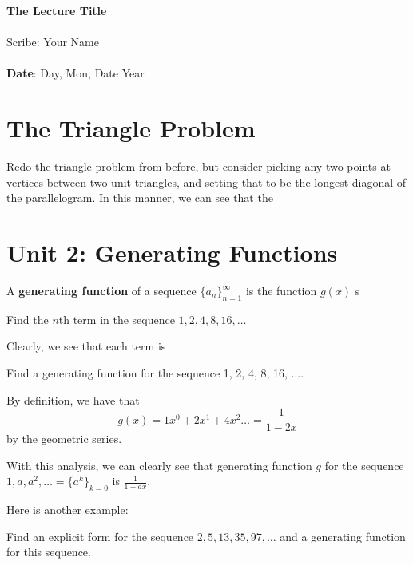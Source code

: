 \documentclass[11pt,twosided]{article}
\def\titlestring{The Lecture Title}
\def\scribestring{Your Name}
\def\datestring{Day, Mon, Date Year}
\begin{document}
\thispagestyle{plain}  %

\noindent
{\LARGE \textbf{\titlestring}}\\\\
%
{\Large Scribe: \scribestring}\\ \\
{\textbf{Date}: \datestring}


\noindent

\section{The Triangle Problem}
Redo the triangle problem from before, but consider picking any two points at vertices between two unit triangles, and setting that to be the longest diagonal of the parallelogram. In this manner, we can see that the 

\section{Unit 2: Generating Functions}
A \textbf{generating function} of a sequence $\{ a_n \}_{n=1}^\infty$ is the function $g(x)$ s

\begin{problem}{1}
	Find the $n$th term in the sequence $1, 2, 4, 8, 16, \ldots$
\end{problem}
\begin{solution}
	Clearly, we see that each term is 
\end{solution}

\begin{problem}{2}
	Find a generating function for the sequence 1, 2, 4, 8, 16, $\ldots$. 
\end{problem}
\begin{solution}
By definition, we have that 
\[
		g(x) = 1x^0 + 2x^1 + 4x^2 \ldots = \frac{1}{1-2x}
\]
by the geometric series. 
\end{solution}

With this analysis, we can clearly see that generating function $g$ for the sequence $1, a, a^2, \ldots = \{ a^k \}_{k=0}$ is $\frac{1}{1-ax}$. 

Here is another example: 
\begin{problem}
	Find an explicit form for the sequence $2, 5, 13, 35, 97, \ldots$ and a generating function for this sequence. 
\end{problem}
\end{document}
